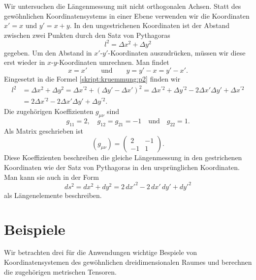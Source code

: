 %
%
\begin{beispiel}
Wir untersuchen die Längenmessung mit nicht orthogonalen Achsen.
Statt des gewöhnli\-chen Koordinatensystems in einer Ebene verwenden
wir die Koordinaten $x'=x$ und $y'=x+y$.
In den ungestrichenen Koordinaten ist der Abstand zwischen zwei
Punkten durch den Satz von Pythagoras
\begin{equation}
l^2 = \Delta x^2 + \Delta y^2
\label{skript:kruemmung:p2}
\end{equation}
gegeben.
Um den Abstand in $x'$-$y'$-Koordinaten auszudrücken, müssen wir diese
erst wieder in $x$-$y$-Koordinaten umrechnen. 
Man findet
\[
x=x'
\qquad\text{und}\qquad
y=y'-x=y'-x'.
\]
Eingesetzt in die Formel \eqref{skript:kruemmung:p2} finden wir
\begin{align*}
l^2
&=
\Delta x^2 + \Delta y^2
=
\Delta x^{\prime 2}
+
(\Delta y'- \Delta x')^2
=
\Delta x^{\prime 2}
+
\Delta y^{\prime 2}-2\Delta x'\Delta y' + \Delta x^{\prime 2}
\\
&= 2 \Delta x^{\prime 2} - 2 \Delta x'\Delta y'+\Delta y^{\prime 2}.
\end{align*}
Die zugehörigen Koeffizienten $g_{\mu\nu}$ sind
\[
g_{11} = 2,\quad
g_{12}=g_{21}=-1\quad\text{und}\quad
g_{22}=1.
\]
Als Matrix geschrieben ist
\[
(g_{\mu\nu})
=
\begin{pmatrix}
 2&-1\\
-1& 1
\end{pmatrix}.
\]
Diese Koeffizienten beschreiben die gleiche Längenmessung in den 
gestrichenen Koordinaten wie der Satz von Pythagoras in den ursprünglichen
Koordinaten.
Man kann sie auch in der Form
\[
ds^2
=
dx^2+dy^2
=
2\,dx'^2-2\,dx'\,dy'+dy'^2
\]
als Längenelemente beschreiben.
\end{beispiel}


\section{Beispiele}
Wir betrachten drei für die Anwendungen wichtige Bespiele von
Koordinatensystemen des gewöhnlichen dreidimensionalen Raumes
und berechnen die zugehörigen metrischen Tensoren.

